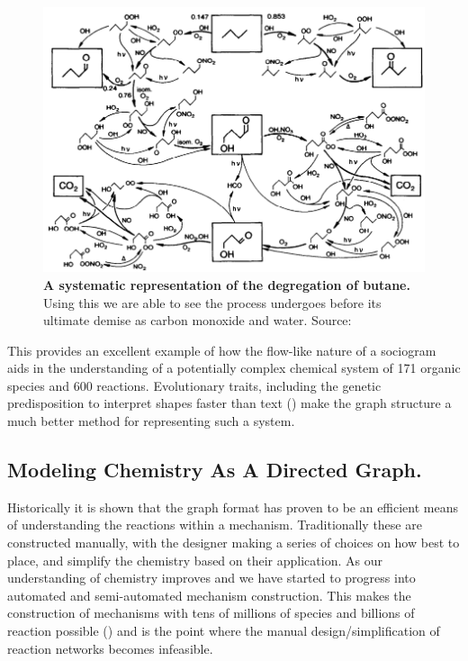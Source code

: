 \begin{figure}[h]
    \centering
        \includegraphics[width=\textwidth]{figures_c1/butane.png}

       \caption{\textbf{A systematic representation of the degregation of butane.} Using this we are able to see the process  undergoes before its ultimate demise as carbon monoxide and water. Source: \citep{butane} }
       \label{fig:butane}
\end{figure}


This provides an excellent example of how the flow-like nature of a sociogram aids in the understanding of a potentially complex chemical system of 171 organic species and 600 reactions. Evolutionary traits, including the genetic predisposition to interpret shapes faster than text (\citep{sapiens}) make the graph structure a much better method for representing such a system.





\subsection{Modeling Chemistry As A Directed Graph.}

Historically it is shown that the graph format has proven to be an efficient means of understanding the reactions within a mechanism. Traditionally these are constructed manually, with the designer making a series of choices on how best to place, and simplify the chemistry based on their application. As our understanding of chemistry improves and we have started to progress into automated and semi-automated mechanism construction. This makes the construction of mechanisms with tens of millions of species and billions of reaction possible (\citep{protocol}) and is the point where the manual design/simplification of reaction networks becomes infeasible.

